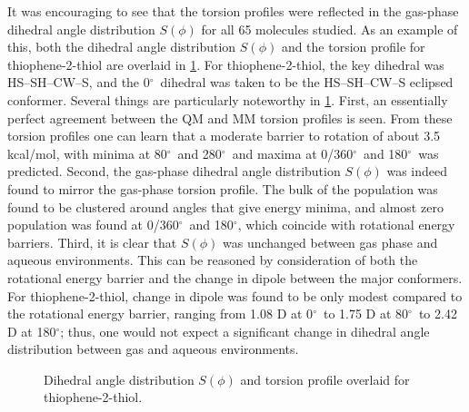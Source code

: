 \documentclass[12pt]{report}
\def\deg{$^{\circ}$}
\begin{document}
It was encouraging to see that the torsion profiles were reflected in the gas-phase dihedral angle distribution $S(\phi)$ for all 65 molecules studied. As an example of this, both the dihedral angle distribution $S(\phi)$ and the torsion profile for thiophene-2-thiol are overlaid in \cref{sphi}. For thiophene-2-thiol, the key dihedral was HS--SH--CW--S, and the 0\deg\ dihedral was taken to be the HS--SH--CW--S eclipsed conformer. Several things are particularly noteworthy in \cref{sphi}. First, an essentially perfect agreement between the QM and MM torsion profiles is seen. From these torsion profiles one can learn that a moderate barrier to rotation of about 3.5 kcal/mol, with minima at 80\deg\ and 280\deg\ and maxima at 0/360\deg\ and 180\deg\ was predicted. Second, the gas-phase dihedral angle distribution $S(\phi)$ was indeed found to mirror the gas-phase torsion profile. The bulk of the population was found to be clustered around angles that give energy minima, and almost zero population was found at 0/360\deg\ and 180\deg{}, which coincide with rotational energy barriers. Third, it is clear that $S(\phi)$ was unchanged between gas phase and aqueous environments. This can be reasoned by consideration of both the rotational energy barrier and the change in dipole between the major conformers. For thiophene-2-thiol, change in dipole was found to be only modest compared to the rotational energy barrier, ranging from 1.08 D at 0\deg\ to 1.75 D at 80\deg\ to 2.42 D at 180\deg; thus, one would not expect a significant change in dihedral angle distribution between gas and aqueous environments.

\begin{figure}[t]
\centering

\caption{Dihedral angle distribution $S(\phi)$ and torsion profile overlaid for thiophene-2-thiol.}
\label{sphi}
\end{figure}
\end{document}
